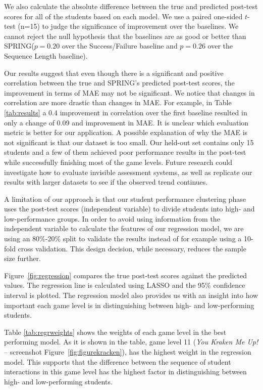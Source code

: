 \documentclass{sigchi}
\def\algname{SPRING\xspace}
\begin{document}
	We also calculate the absolute difference between the true and predicted post-test scores for all of the students based on each model.
	We use a paired one-sided $t$-test (n=15) to judge the significance of improvement over the baselines.
	We cannot reject the null hypothesis that the baselines are as good or better than  \algname ($p=0.20$ over the Success/Failure baseline and $p=0.26$ over the Sequence Length baseline).
	
	Our results suggest that even though there is a significant and positive correlation between the true and \algname's predicted post-test scores, the improvement in terms of MAE  may not be significant. 	
	We notice that changes in correlation are more drastic than changes in MAE.
	For example, in Table \ref{tab:results}  a 0.4 improvement in correlation over the first baseline resulted in only a change of 0.09 and  improvement in MAE.
	It is unclear which evaluation metric is better for our application.
	A possible explanation of why the MAE is not significant is that our dataset is too small. 
	Our held-out set contains only 15 students and a few of them achieved poor performance results in the post-test while successfully finishing most of the game levels. 
	Future research could investigate how to evaluate invisible assessment systems, as well as replicate our results with larger datasets to see if the observed trend continues.

	A limitation of our approach is that our student performance clustering phase uses the post-test scores (independent variable) to divide students into high- and low-performance groups.
	In order to avoid using information from the independent variable to calculate the features of our regression model, we are using an 80\%-20\% split to validate the results instead of for example using a 10-fold cross validation.
	This design decision, while necessary, reduces the sample size further.
	
	Figure~\ref{fig:regression} compares the true post-test scores against the predicted values.
	The regression line is calculated using LASSO and the 95\% confidence interval is plotted.
	The regression model also provides us with an insight into how important each game level is in distinguishing between high- and low-performing students.
	
	Table \ref{tab:regrweights} shows the weights of each game level in the best performing model.
	As it is shown in the table, game level 11 (\textit{You Kraken Me Up!} -- screenshot Figure~\ref{fig:figurekracken}), has the highest weight in the regression model. 
	This supports that the difference between the sequence of student interactions in this game level has the highest factor in distinguishing between high- and low-performing students.
	
\end{document}
